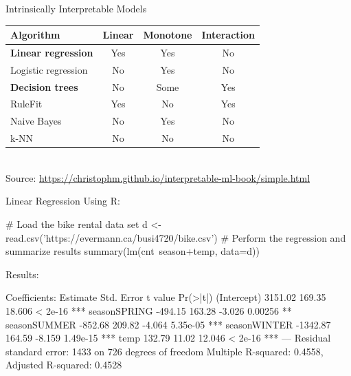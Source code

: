 \documentclass[ignorenonframetext,xcolor=x11names]{beamer}
\begin{document}
\begin{frame}[label=full]{Intrinsically Interpretable Models}

\centering
\renewcommand{\arraystretch}{1.25}

\begin{tabular}{lccc} \hline
Algorithm & Linear & Monotone & Interaction \\ \hline
\textbf{Linear regression} & Yes & Yes & No  \\ 
Logistic regression & No & Yes & No  \\
\textbf{Decision trees} & No & Some & Yes  \\
RuleFit & Yes & No & Yes  \\
Naive Bayes & No & Yes & No \\
k-NN & No & No & No  \\ \hline
\end{tabular} \\
\bigskip
\scriptsize Source: \url{https://christophm.github.io/interpretable-ml-book/simple.html}\normalsize
\end{frame}

\begin{frame}[label=withcode,fragile]{Linear Regression}
Using R:
\begin{Rcode}
# Load the bike rental data set
d <- read.csv('https://evermann.ca/busi4720/bike.csv')
# Perform the regression and summarize results
summary(lm(cnt~season+temp, data=d))
\end{Rcode}
Results:
\begin{textcode}
Coefficients:
             Estimate Std. Error t value Pr(>|t|)    
(Intercept)   3151.02     169.35  18.606  < 2e-16 ***
seasonSPRING  -494.15     163.28  -3.026  0.00256 ** 
seasonSUMMER  -852.68     209.82  -4.064 5.35e-05 ***
seasonWINTER -1342.87     164.59  -8.159 1.49e-15 ***
temp           132.79      11.02  12.046  < 2e-16 ***
---
Residual standard error: 1433 on 726 degrees of freedom
Multiple R-squared: 0.4558, Adjusted R-squared: 0.4528 
\end{textcode}
\end{frame}
\end{document}
